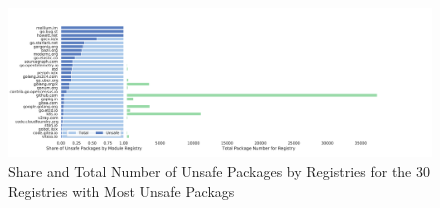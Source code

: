 \begin{figure}[!t]
    \centering
    \includegraphics[width=\textwidth]{assets/plots/chapter4/unsafe-packages-by-registry-n30.pdf}
    \caption{Share and Total Number of Unsafe Packages by Registries for the 30 Registries with Most Unsafe Packags}
    \label{fig:unsafe-packages-by-registry-n30}
\end{figure}
